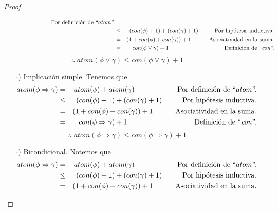\documentclass{article}
\begin{document}
\begin{enumerate}
\begin{itemize}
\begin{proof}
\begin{itemize}
\begin{eqnarray*}
        \hspace*{2.1cm} \text{Por definición de ``$atom$''.}\\
        &\leq& (con(\phi) + 1) + (con(\gamma) + 1)
        \hspace*{1cm} \text{Por hipótesis inductiva.}\\
        &=& (1 + con(\phi) + con(\gamma)) + 1
        \hspace*{1.1cm} \text{Asociatividad en la suma.}\\
        &=& con(\phi \lor \gamma) + 1
        \hspace*{3.4cm} \text{Definición de ``\textit{con}''.}
      \end{eqnarray*}
      \[
      \therefore \; atom(\phi \lor \gamma) \leq con(\phi \lor \gamma) + 1
      \]
    \item[$\cdot$)] Implicación simple. Tenemos que
      \begin{eqnarray*}
        atom(\phi \Rightarrow \gamma) &=& atom(\phi) + atom(\gamma)
        \hspace*{2.1cm} \text{Por definición de ``$atom$''.}\\
        &\leq& (con(\phi) + 1) + (con(\gamma) + 1)
        \hspace*{1cm} \text{Por hipótesis inductiva.}\\
        &=& (1 + con(\phi) + con(\gamma)) + 1
        \hspace*{1.1cm} \text{Asociatividad en la suma.}\\
        &=& con(\phi \Rightarrow \gamma) + 1
        \hspace*{3.3cm} \text{Definición de ``\textit{con}''.}
      \end{eqnarray*}
      \[
      \therefore \; atom(\phi \Rightarrow \gamma) \leq con(\phi \Rightarrow \gamma) + 1
      \]
    \item[$\cdot$)] Bicondicional. Notemos que
      \begin{eqnarray*}
        atom(\phi \Leftrightarrow \gamma) &=& atom(\phi) + atom(\gamma)
        \hspace*{2.1cm} \text{Por definición de ``$atom$''.}\\
        &\leq& (con(\phi) + 1) + (con(\gamma) + 1)
        \hspace*{1cm} \text{Por hipótesis inductiva.}\\
        &=& (1 + con(\phi) + con(\gamma)) + 1
        \hspace*{1.1cm} \text{Asociatividad en la suma.}\\

\end{eqnarray*}
\end{itemize}
\end{proof}
\end{itemize}
\end{enumerate}
\end{document}
